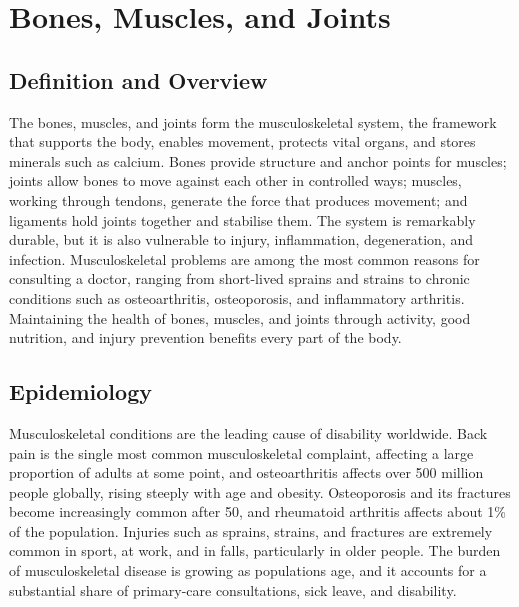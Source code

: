 \chapter{Bones, Muscles, and Joints}

\section*{Definition and Overview}
The bones, muscles, and joints form the musculoskeletal system, the framework that supports the body, enables movement, protects vital organs, and stores minerals such as calcium. Bones provide structure and anchor points for muscles; joints allow bones to move against each other in controlled ways; muscles, working through tendons, generate the force that produces movement; and ligaments hold joints together and stabilise them. The system is remarkably durable, but it is also vulnerable to injury, inflammation, degeneration, and infection. Musculoskeletal problems are among the most common reasons for consulting a doctor, ranging from short-lived sprains and strains to chronic conditions such as osteoarthritis, osteoporosis, and inflammatory arthritis. Maintaining the health of bones, muscles, and joints through activity, good nutrition, and injury prevention benefits every part of the body.

\section*{Epidemiology}
Musculoskeletal conditions are the leading cause of disability worldwide. Back pain is the single most common musculoskeletal complaint, affecting a large proportion of adults at some point, and osteoarthritis affects over 500 million people globally, rising steeply with age and obesity. Osteoporosis and its fractures become increasingly common after 50, and rheumatoid arthritis affects about 1\% of the population. Injuries such as sprains, strains, and fractures are extremely common in sport, at work, and in falls, particularly in older people. The burden of musculoskeletal disease is growing as populations age, and it accounts for a substantial share of primary-care consultations, sick leave, and disability.

